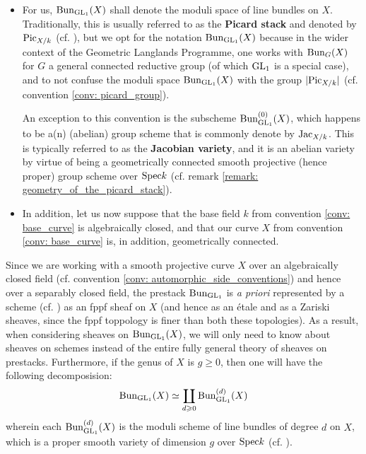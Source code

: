         \begin{convention} \label{conv: automorphic_side_conventions}
            \noindent
            \begin{itemize}
                \item For us, $\mathrm{Bun}_{\operatorname{GL}_1}(X)$ shall denote the moduli space of line bundles on $X$. Traditionally, this is usually referred to as the \textbf{Picard stack} and denoted by $\mathrm{Pic}_{X/k}$ (cf. \cite[\href{https://stacks.math.columbia.edu/tag/0372}{Tag 0372}]{stacks}), but we opt for the notation $\mathrm{Bun}_{\operatorname{GL}_1}(X)$ because in the wider context of the Geometric Langlands Programme, one works with $\mathrm{Bun}_G(X)$ for $G$ a general connected reductive group (of which $\operatorname{GL}_1$ is a special case), and to not confuse the moduli space $\mathrm{Bun}_{\operatorname{GL}_1}(X)$ with the group $|\mathrm{Pic}_{X/k}|$ (cf. convention \ref{conv: picard_group}). 
            
                An exception to this convention is the subscheme $\mathrm{Bun}_{\operatorname{GL}_1}^{(0)}(X)$, which happens to be a(n) (abelian) group scheme that is commonly denote by $\mathrm{Jac}_{X/k}$. This is typically referred to as the \textbf{Jacobian variety}, and it is an abelian variety by virtue of being a geometrically connected smooth projective (hence proper) group scheme over $\mathrm{Spec} k$ (cf. remark \ref{remark: geometry_of_the_picard_stack}).
                \item In addition, let us now suppose that the base field $k$ from convention \ref{conv: base_curve} is algebraically closed, and that our curve $X$ from convention \ref{conv: base_curve} is, in addition, geometrically connected. 
            \end{itemize}
        \end{convention}
        \begin{remark} \label{remark: geometry_of_the_picard_stack}
            Since we are working with a smooth projective curve $X$ over an algebraically closed field (cf. convention \ref{conv: automorphic_side_conventions}) and hence over a separably closed field, the prestack $\mathrm{Bun}_{\operatorname{GL}_1}$ is \textit{a priori} represented by a scheme (cf. \cite[\href{https://stacks.math.columbia.edu/tag/0B9Z}{Tag 0B9Z}]{stacks}) as an fppf sheaf on $X$ (and hence as an \'etale and as a Zariski sheaves, since the fppf toppology is finer than both these topologies). As a result, when considering sheaves on $\mathrm{Bun}_{\operatorname{GL}_1}(X)$, we will only need to know about sheaves on schemes instead of the entire fully general theory of sheaves on prestacks. Furthermore, if the genus of $X$ is $g \geq 0$, then one will have the following decomposision:
                $$\mathrm{Bun}_{\operatorname{GL}_1}(X) \simeq \coprod_{d \geqslant 0} \mathrm{Bun}_{\operatorname{GL}_1}^{(d)}(X)$$
            wherein each $\mathrm{Bun}_{\operatorname{GL}_1}^{(d)}(X)$ is the moduli scheme of line bundles of degree $d$ on $X$, which is a proper smooth variety of dimension $g$ over $\mathrm{Spec} k$ (cf. \cite[\href{https://stacks.math.columbia.edu/tag/0BA0}{Tag 0BA0}]{stacks}).
        \end{remark}
        
